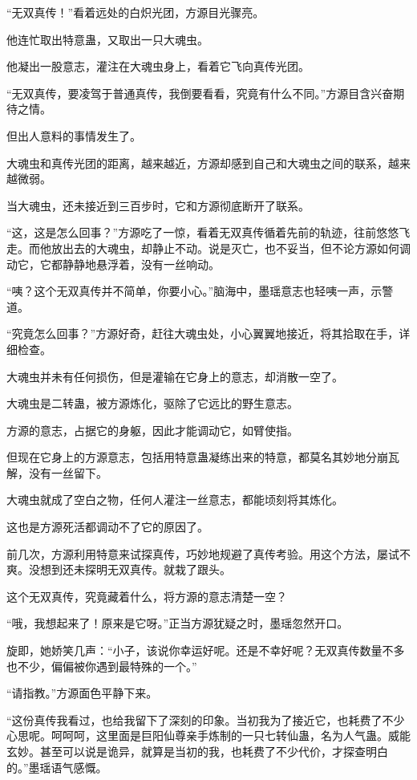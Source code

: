 
\begin{this_body}

“无双真传！”看着远处的白炽光团，方源目光骤亮。

他连忙取出特意蛊，又取出一只大魂虫。

他凝出一股意志，灌注在大魂虫身上，看着它飞向真传光团。

“无双真传，要凌驾于普通真传，我倒要看看，究竟有什么不同。”方源目含兴奋期待之情。

但出人意料的事情发生了。

大魂虫和真传光团的距离，越来越近，方源却感到自己和大魂虫之间的联系，越来越微弱。

当大魂虫，还未接近到三百步时，它和方源彻底断开了联系。

“这，这是怎么回事？”方源吃了一惊，看着无双真传循着先前的轨迹，往前悠悠飞走。而他放出去的大魂虫，却静止不动。说是灭亡，也不妥当，但不论方源如何调动它，它都静静地悬浮着，没有一丝响动。

“咦？这个无双真传并不简单，你要小心。”脑海中，墨瑶意志也轻咦一声，示警道。

“究竟怎么回事？”方源好奇，赶往大魂虫处，小心翼翼地接近，将其拾取在手，详细检查。

大魂虫并未有任何损伤，但是灌输在它身上的意志，却消散一空了。

大魂虫是二转蛊，被方源炼化，驱除了它远比的野生意志。

方源的意志，占据它的身躯，因此才能调动它，如臂使指。

但现在它身上的方源意志，包括用特意蛊凝练出来的特意，都莫名其妙地分崩瓦解，没有一丝留下。

大魂虫就成了空白之物，任何人灌注一丝意志，都能顷刻将其炼化。

这也是方源死活都调动不了它的原因了。

前几次，方源利用特意来试探真传，巧妙地规避了真传考验。用这个方法，屡试不爽。没想到还未探明无双真传。就栽了跟头。

这个无双真传，究竟藏着什么，将方源的意志清楚一空？

“哦，我想起来了！原来是它呀。”正当方源犹疑之时，墨瑶忽然开口。

旋即，她娇笑几声：“小子，该说你幸运好呢。还是不幸好呢？无双真传数量不多也不少，偏偏被你遇到最特殊的一个。”

“请指教。”方源面色平静下来。

“这份真传我看过，也给我留下了深刻的印象。当初我为了接近它，也耗费了不少心思呢。呵呵呵，这里面是巨阳仙尊亲手炼制的一只七转仙蛊，名为人气蛊。威能玄妙。甚至可以说是诡异，就算是当初的我，也耗费了不少代价，才探查明白的。”墨瑶语气感慨。


\end{this_body}
